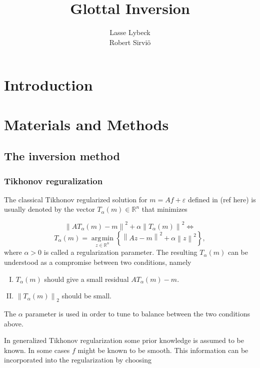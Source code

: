 \documentclass[12pt,a4]{article}
\title{Glottal Inversion}
\author{Lasse Lybeck\\Robert Sirviö}
\DeclareMathOperator*{\argmin}{\arg\!\min}
\newcommand{\R}{{\mathbb R}}
\newcommand{\lnorm}{\left\|}
\newcommand{\rnorm}{\right\|}
\begin{document}
\maketitle

\section{Introduction}\label{sec:intro}


\section{Materials and Methods}\label{sec:methods}

\subsection{The inversion method}\label{subsec:invMethod}

\subsubsection{Tikhonov reguralization}\label{subsubsec:tikh}
The classical Tikhonov regularized solution for $m = Af + \varepsilon$ defined in (ref here) is usually denoted by the vector $T_\alpha(m)\in\R^n$
that minimizes

\begin{equation*}
\lnorm AT_\alpha(m) - m \rnorm^2 + \alpha \lnorm T_\alpha(m) \rnorm^2 \Leftrightarrow
\end{equation*}
\begin{equation*}
T_\alpha(m) = \underset{z\in\R^n}{\argmin}
\left\{ \lnorm Az - m \rnorm^2 + \alpha \lnorm z \rnorm^2 \right\},
\end{equation*}
where $\alpha > 0$ is called a regularization parameter. The resulting $T_\alpha(m)$ can be understood as a compromise between two conditions, namely

\begin{enumerate}[I.]
 \item $T_\alpha(m)$ should give a small residual $AT_\alpha(m) - m$.
 \item $\lnorm T_\alpha(m) \rnorm_2$ should be small.
\end{enumerate}
The $\alpha$ parameter is used in order to tune to balance between the two conditions above.

In generalized Tikhonov regularization some prior knowledge is assumed to be known. In some cases $f$ might be known to be smooth. This information can be incorporated into the regularization by choosing 
\end{document}
